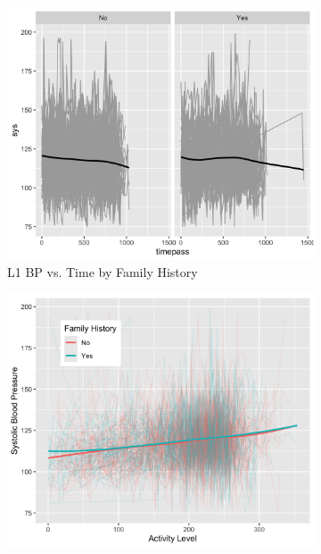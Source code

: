 \documentclass[12pt,twoside,letterpaper]{article}
\theoremstyle{definition}
\theoremstyle{definition}
\begin{document}
\begin{appendices}
    \begin{figure} 
        \centering
        \begin{subfigure}{0.32\textwidth}
            \centering
            \includegraphics[width=\textwidth]{pics/bp v time and fh facet.png}
            \caption{{\small L1 BP vs. Time by Family History}}
            \label{fig: bp by time and fh}
        \end{subfigure}
        \hfill
        \begin{subfigure}{0.32\textwidth}
            \centering
            \includegraphics[width=\textwidth]{pics/bp v act and fh.png}

\end{subfigure}
\end{figure}
\end{appendices}
\end{document}
